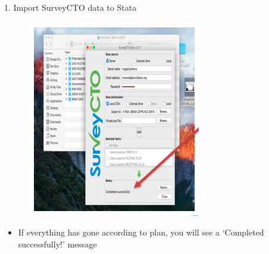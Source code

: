 \documentclass[aspectratio=169]{beamer}
\begin{document}
\begin{frame}[fragile]{1. Import SurveyCTO data to Stata}
\begin{multicols}{2}	
	\begin{figure}
		\centering
		\includegraphics[width=\linewidth]{img/scto5}
	\end{figure}
	\begin{itemize}
		\item If everything has gone according to plan, you will see a ‘Completed successfully!’ message  
	\end{itemize}
\end{multicols}
\end{frame}
\end{document}
